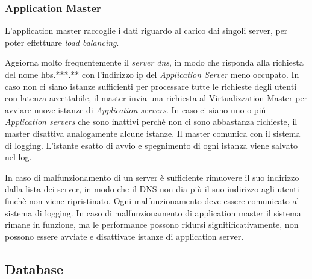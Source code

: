 \subsubsection{Application Master}
L'application master raccoglie i dati riguardo al carico dai singoli server, per poter effettuare \emph{load balancing}.

Aggiorna molto frequentemente il \emph{server dns}, in modo che risponda alla richiesta del nome hbs.***.** con l'indirizzo ip del \emph{Application Server} meno occupato.
In caso non ci siano istanze sufficienti per processare tutte le richieste degli utenti con latenza accettabile, il master invia una richiesta al Virtualizzation Master per avviare nuove istanze di \emph{Application servers}.
In caso ci siano uno o pi\'u \emph{Application servers} che sono inattivi perch\'e non ci sono abbastanza richieste, il master disattiva analogamente alcune istanze.
Il master comunica con il sistema di logging.
L'istante esatto di avvio e spegnimento di ogni istanza viene salvato nel log.

In caso di malfunzionamento di un server \`e sufficiente rimuovere il suo indirizzo dalla lista dei server, in modo che il DNS non dia pi\`u il suo indirizzo agli utenti finch\`e non viene ripristinato.
Ogni malfunzionamento deve essere comunicato al sistema di logging.
In caso di malfunzionamento di application master il sistema rimane in funzione, ma le performance possono ridursi signitificativamente, non possono essere avviate e disattivate istanze di application server.

\subsection{Database}
